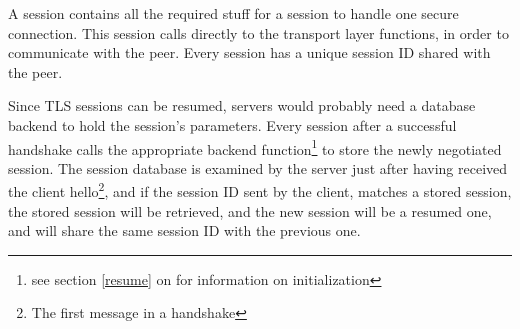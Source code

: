 \par A \gnutls{} session contains all the required stuff for a
session to handle one secure connection. This session calls directly
to the transport layer functions, in order to communicate with the peer.
Every session has a unique session ID shared with the peer.

\par
Since TLS sessions can be resumed, servers would probably need a database
backend to hold the session's parameters. Every \gnutls{} session after
a successful handshake calls the appropriate backend function\footnote{see section \ref{resume}
on \pageref{resume} for information on initialization} to store the
newly negotiated session. The session database is examined by the server
just after having received the client hello\footnote{The first message
in a \tls{} handshake}, and if the session ID sent by the client,
matches a stored session, the stored session will be retrieved, and the
new session will be a resumed one, and will share the same session ID
with the previous one.




